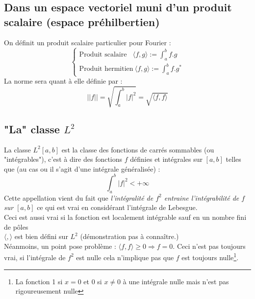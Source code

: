 \documentclass[11pt, a4paper, openany]{book}
\begin{document}
		\subsection{Dans un espace vectoriel muni d'un produit scalaire (espace préhilbertien)}
		On définit un produit scalaire particulier pour Fourier :
		\begin{equation}
			\left\{\begin{array}{l}
			\text{Produit scalaire}\ \ \ \ \langle f,g \rangle := \int_a^b f.g\\
			\text{Produit hermitien} \ \langle f,g \rangle := \int_a^b f.g^*
			\end{array}\right.
		\end{equation}
		La norme sera quant à elle définie par : 
		\begin{equation}
			||f|| = \sqrt{\int_a^b |f|^2} = \sqrt{\langle f,f\rangle}
		\end{equation}
		\subsection{"La" classe $L^2$}
		La classe $L^2[a,b]$ est la classe des fonctions de carrés sommables (ou "intégrables"), c'est à dire des fonctions $f$ définies et intégrales sur $[a,b]$ telles que (au cas ou il s'agit d'une intégrale généralisée) :
		\begin{equation}
			\int_a^b |f|^2 < +\infty
		\end{equation}
		Cette appellation vient du fait que \textit{l'intégralité de $f^2$ entraine l'intégrabilité de $f$ sur $[a,b]$} ce qui est vrai en considérant l'intégrale de Lebesgue.\\
		Ceci est aussi vrai si la fonction est localement intégrable sauf en un nombre fini de pôles\\
									
		$\langle , \rangle$ est bien défini sur $L^2$ (démonstration pas à connaître.)\\
		Néanmoins, un point pose problème : $\langle f,f \rangle \geq 0 \Rightarrow f = 0$. Ceci n'est pas toujours vrai, si l'intégrale de $f^2$ est nulle cela n'implique pas que $f$ est toujours nulle\footnote{La fonction 1 si $x=0$ et 0 si $x\neq 0$ à une intégrale nulle mais n'est pas rigoureusement nulle}.\\
									
\end{document}
